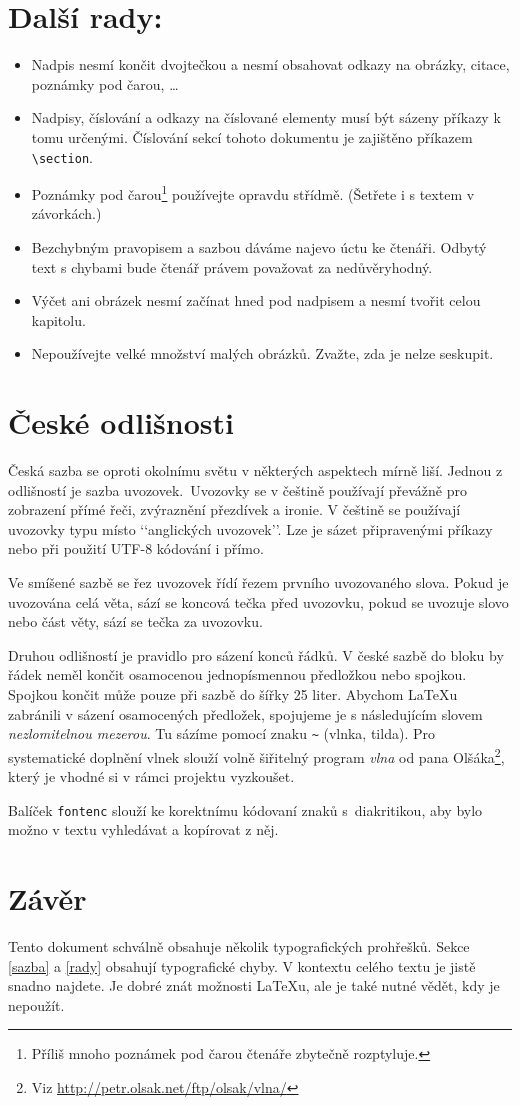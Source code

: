 \documentclass[a4paper, 10pt, twocolumn]{article}
\begin{document}
\section{\label{rady}Další rady:}
\begin{itemize}
    \item Nadpis nesmí končit dvojtečkou a nesmí obsahovat odkazy na obrázky, citace, poznámky pod čarou, \dots
    \item Nadpisy, číslování a odkazy na číslované elementy musí být sázeny příkazy k tomu určenými. Číslování sekcí tohoto dokumentu je zajištěno příkazem \verb|\section|.
    \item Poznámky pod čarou\footnote[1]{Příliš mnoho poznámek pod čarou čtenáře zbytečně rozptyluje.} používejte opravdu střídmě. (Šetřete i s textem v závorkách.)
    \item Bezchybným pravopisem a sazbou dáváme najevo úctu ke čtenáři. Odbytý text s chybami bude čtenář právem považovat za nedůvěryhodný.
    \item Výčet ani obrázek nesmí začínat hned pod nadpisem a nesmí tvořit celou kapitolu.
    \item Nepoužívejte velké množství malých obrázků. Zvažte, zda je nelze seskupit.
\end{itemize}
\section{České odlišnosti}
Česká sazba se oproti okolnímu světu v některých aspektech mírně liší. Jednou z odlišností je sazba uvozovek.~Uvozovky se v češtině používají převážně pro 
zobrazení přímé řeči, zvýraznění přezdívek a ironie. V češtině se \mbox{používají} uvozovky typu  místo ‘‘anglických uvozovek’’.
Lze je sázet připravenými příkazy nebo při použití UTF-8 kódování i přímo.
\par
Ve smíšené sazbě se řez uvozovek řídí řezem prvního uvozovaného slova.
Pokud je uvozována celá věta, sází se koncová tečka před uvozovku, pokud se uvozuje slovo nebo část věty, sází se tečka za uvozovku.
\par
Druhou odlišností je pravidlo pro sázení konců řádků.
V české sazbě do bloku by řádek neměl končit osamocenou jednopísmennou předložkou nebo spojkou.
Spojkou  končit může pouze při sazbě do šířky 25 liter.
Abychom \LaTeX u zabránili v sázení osamocených předložek, spojujeme je s následujícím slovem \textit{nezlomitelnou mezerou}.
Tu sázíme pomocí znaku \verb|~| (vlnka, tilda).
Pro systematické doplnění vlnek slouží volně šiřitelný program \textit{vlna} od pana Olšáka\footnote[2]{Viz \href{http://petr.olsak.net/ftp/olsak/vlna/}{http://petr.olsak.net/ftp/olsak/vlna/}}, který je vhodné si v rámci projektu vyzkoušet.
\par
Balíček \texttt{fontenc} slouží ke korektnímu kódovaní znaků s~diakritikou, aby bylo možno v textu vyhledávat a kopírovat z něj.


\section{Závěr}
Tento dokument schválně obsahuje několik typografických prohřešků.
Sekce \ref{sazba} a \ref{rady}  obsahují typografické chyby.
V kontextu celého textu je jistě snadno najdete.
Je dobré znát možnosti \LaTeX u, ale je také nutné vědět, kdy je nepoužít.
\end{document}
